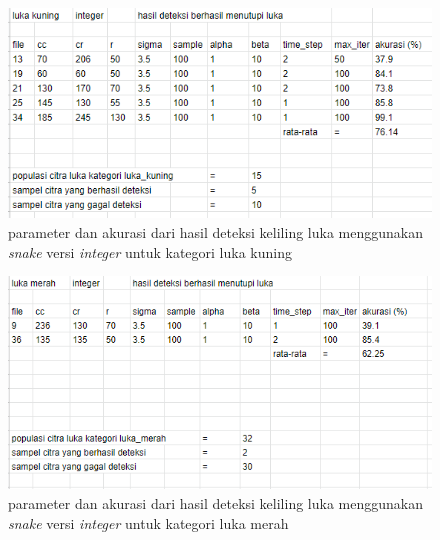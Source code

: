 \begin{figure}[H]
	\centering
	\includegraphics[width=1\textwidth]{gambar/result_kuning_good}
	\caption{parameter dan akurasi dari hasil deteksi keliling luka menggunakan \emph{snake} versi \emph{integer} untuk kategori luka kuning}
	\label{Gambar:result_kuning_good}
\end{figure}

\begin{figure}[H]
	\centering
	\includegraphics[width=1\textwidth]{gambar/result_merah_good}
	\caption{parameter dan akurasi dari hasil deteksi keliling luka menggunakan \emph{snake} versi \emph{integer} untuk kategori luka merah}
	\label{Gambar:result_merah_good}
\end{figure}


